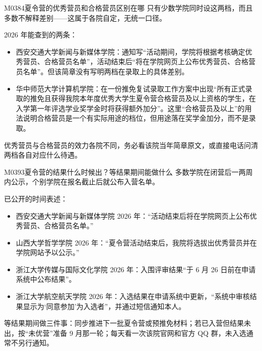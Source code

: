 \begin{qa}{M0384}{夏令营的优秀营员和合格营员区别在哪}
只有少数学院同时设这两档，而且多数不解释差别——这属于各院自定，无统一口径。

2026 年能查到的两条：
\begin{itemize}
  \item 西安交通大学新闻与新媒体学院：通知写“活动期间，学院将根据考核确定优秀营员、合格营员名单”，活动结束后“将在学院网页上公布优秀营员、合格营员名单”。但该简章没有写明两档在录取上的具体差别。
  \item 华中师范大学计算机学院：在一份推免复试录取工作方案中出现“所有正式录取的推免且获得我院本年度优秀大学生夏令营合格营员及以上资格的学生，在入学第一年评选学业奖学金时将获得额外加分”。这里“合格营员及以上”的用法说明合格营员是一个有实际用途的档位，但用途落在奖学金加分，而不是录取。
\end{itemize}

优秀营员与合格营员的效力各院不同，务必看该院当年简章原文，或直接电话问清两档各自对应什么待遇。
\end{qa}

\begin{qa}{M0393}{夏令营的结果什么时候出？等结果期间能做什么}
多数学院在闭营后一两周内公示，个别学院在报名截止后就公布入营名单。

已公开的时间表述：
\begin{itemize}
  \item 西安交通大学新闻与新媒体学院 2026 年：“活动结束后将在学院网页上公布优秀营员、合格营员名单。”
  \item 山西大学哲学学院 2026 年：“夏令营活动结束后，我院将选拔出优秀营员并在学院网站予以公示。”
  \item 浙江大学传媒与国际文化学院 2026 年：入围评审结果“于 6 月 26 日前在申请系统中公布结果”。
  \item 浙江大学航空航天学院 2026 年：入选结果在申请系统中更新，“系统中审核结果显示为‘同意参加’为入选者”，并通过短信通知本人。
\end{itemize}

等结果期间做三件事：同步推进下一批夏令营或预推免材料；若已入营但结果未出，按“未优营”准备 9 月那一轮；每天看一次该院官网和官方 QQ 群，未入选通常不另行通知。
\end{qa}

